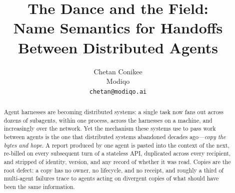 \documentclass[10pt,twocolumn]{article}
\title{\vspace{-1.2em}\textbf{The Dance and the Field:\\[2pt]
Name Semantics for Handoffs Between Distributed Agents}}
\author{
  Chetan Conikee\\
  \normalsize Modiqo\\
  \normalsize\texttt{chetan@modiqo.ai}
}
\date{}
\begin{document}
\maketitle

\begin{abstract}
\noindent
Agent harnesses are becoming distributed systems: a single task now fans
out across dozens of subagents, within one process, across the harnesses
on a machine, and increasingly over the network. Yet the mechanism these
systems use to pass work between agents is the one that distributed
systems abandoned decades ago---\emph{copy the bytes and hope}. A report
produced by one agent is pasted into the context of the next, re-billed
on every subsequent turn of a stateless API, duplicated across every
recipient, and stripped of identity, version, and any record of whether
it was read. Copies are the root defect: a copy has no owner, no
lifecycle, and no receipt, and roughly a third of multi-agent failures
trace to agents acting on divergent copies of what should have been the
same information.


\end{abstract}
\end{document}
